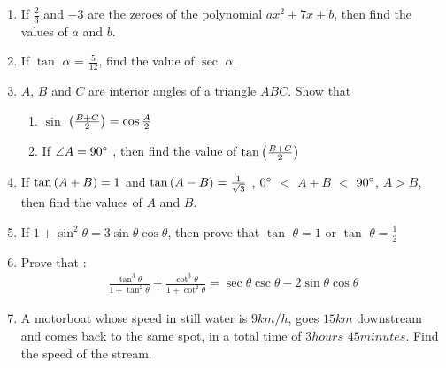 \begin{enumerate}
\item If $\frac{2}{3}$ and $-3$ are the zeroes of the polynomial $ax^2 + 7x + b$, then find the values of $a$ and $b$.

\item If $\tan$ $\alpha$ = ${\frac {5}{12}}$, find the value of $\sec$ $\alpha$.

\item $A$, $B$ and $C$ are interior angles of a triangle $ABC$. Show that
\begin{enumerate}
\item  $\sin$ $ \left({\frac {B+C}{2}}\right) = \cos {\frac {A}{2}}$
\item  If $\angle A = 90 \degree$ , then find the value of $\tan \left({\frac{B+C}{2}}\right)$ 
\end{enumerate} 

\item If $\tan \left(A + B\right) = 1$ and $\tan \left(A - B\right) = \frac{1}{\sqrt{3}}$ , $0\degree$ $<$ $A + B$ $<$ $90\degree$, $A > B$, then find the values of $A$ and $B$.

\item If $1 + \sin^2 \theta  = 3 \sin \theta \cos \theta$, then prove that $\tan$ $\theta = 1 $ or $\tan$ $\theta = \frac{1}{2}$

\item Prove that :
\begin{align*}
\frac{\tan^3 \theta}{1+\tan^2 \theta} + \frac{\cot^3 \theta}{1 + \cot^2 \theta} =  \sec \theta  \csc  \theta - 2 \sin \theta \cos \theta  
\end{align*}

\item A motorboat whose speed in still water is $9 km/h $, goes $15km$ downstream and comes back to the same spot, in a total time of $3 hours$ $45 minutes$. Find the speed of the stream.

\end{enumerate}
